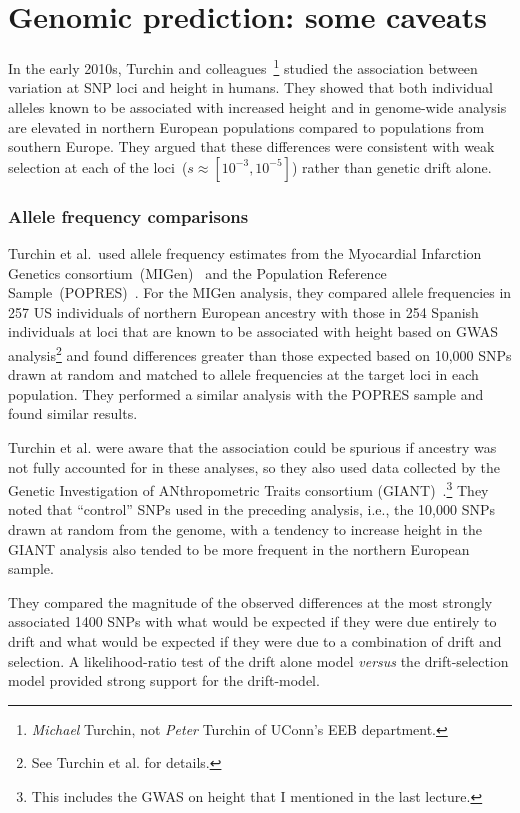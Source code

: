 \chapter{Genomic prediction: some caveats}

In the early 2010s, Turchin and
colleagues~\cite{Turchin-etal-2012}\footnote{{\it Michael\/} Turchin,
  not {\it Peter\/} Turchin of UConn's EEB department.} studied the
association between variation at SNP loci and height in humans. They
showed that both individual alleles known to be associated with
increased height and in genome-wide analysis are elevated in northern
European populations compared to populations from southern
Europe. They argued that these differences were consistent with weak
selection at each of the loci~($s \approx [10^{-3}, 10^{-5}]$) rather
than genetic drift alone.

\subsection*{Allele frequency comparisons}

Turchin et al.\ used allele frequency estimates from the Myocardial
Infarction Genetics consortium~(MIGen)~\cite{MIGen-2009} and the
Population Reference Sample~(POPRES)~\cite{Nelson-etal-2008}. For the MIGen
analysis, they compared allele frequencies in 257 US individuals of
northern European ancestry with those in 254 Spanish individuals at
loci that are known to be associated with height based on GWAS
analysis\footnote{See Turchin et al. for details.} and found
differences greater than those expected based on 10,000 SNPs drawn at
random and matched to allele frequencies at the target loci in each
population. They performed a similar analysis with the POPRES sample
and found similar results.

Turchin et al. were aware that the association could be spurious if
ancestry was not fully accounted for in these analyses, so they also
used data collected by the Genetic Investigation of ANthropometric
Traits consortium (GIANT)~\cite{LangoAllen-etal-2010}.\footnote{This
  includes the GWAS on height that I mentioned in the last lecture.}
They noted that ``control'' SNPs used in the preceding analysis,
i.e., the 10,000 SNPs drawn at random from the genome, with a tendency
to increase height in the GIANT analysis also tended to be more
frequent in the northern European sample.

They compared the magnitude of the observed differences at the most
strongly associated 1400 SNPs with what would be expected if they were
due entirely to drift and what would be expected if they were due to a
combination of drift and selection. A likelihood-ratio test of the
drift alone model {\it versus\/} the drift-selection model provided
strong support for the drift-model.

